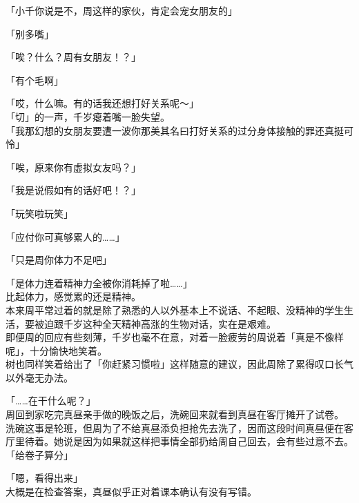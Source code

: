 「小千你说是不，周这样的家伙，肯定会宠女朋友的」

「别多嘴」

「唉？什么？周有女朋友！？」

「有个毛啊」

「哎，什么嘛。有的话我还想打好关系呢～」\\

「切」的一声，千岁瘪着嘴一脸失望。\\

「我那幻想的女朋友要遭一波你那美其名曰打好关系的过分身体接触的罪还真挺可怜」

「唉，原来你有虚拟女友吗？」

「我是说假如有的话好吧！？」

「玩笑啦玩笑」

「应付你可真够累人的……」

「只是周你体力不足吧」

「是体力连着精神力全被你消耗掉了啦……」\\

比起体力，感觉累的还是精神。\\

本来周平常过着的就是除了熟悉的人以外基本上不说话、不起眼、没精神的学生生活，要被迫跟千岁这种全天精神高涨的生物对话，实在是艰难。\\

即便周的回应有些刻薄，千岁也毫不在意，对着一脸疲劳的周说着「真是不像样呢」，十分愉快地笑着。\\

树也同样笑着给出了「你赶紧习惯啦」这样随意的建议，因此周除了累得叹口长气以外毫无办法。\\

\vspace{2\baselineskip}

「……在干什么呢？」\\

周回到家吃完真昼亲手做的晚饭之后，洗碗回来就看到真昼在客厅摊开了试卷。\\

洗碗这事是轮班，但周为了不给真昼添负担抢先去洗了，因而这段时间真昼便在客厅里待着。她说是因为如果就这样把事情全部扔给周自己回去，会有些过意不去。\\

「给卷子算分」

「嗯，看得出来」\\

大概是在检查答案，真昼似乎正对着课本确认有没有写错。\\

